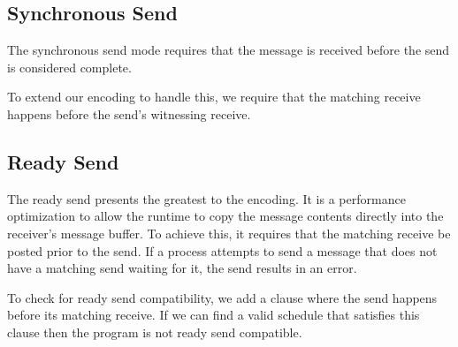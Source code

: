 \subsection{Synchronous Send}
The synchronous send mode requires that the message is received before the send
is considered complete.

To extend our encoding to handle this, we require that the matching receive
happens before the send's witnessing receive.

\subsection{Ready Send}
The ready send presents the greatest to the encoding. It is a performance
optimization to allow the runtime to copy the message contents directly into the
receiver's message buffer. To achieve this, it requires that the matching receive
be posted prior to the send. If a process attempts to send a message that does
not have a matching send waiting for it, the send results in an error.

To check for ready send compatibility, we add a clause where the send happens
before its matching receive. If we can find a valid schedule that satisfies this
clause then the program is not ready send compatible.


